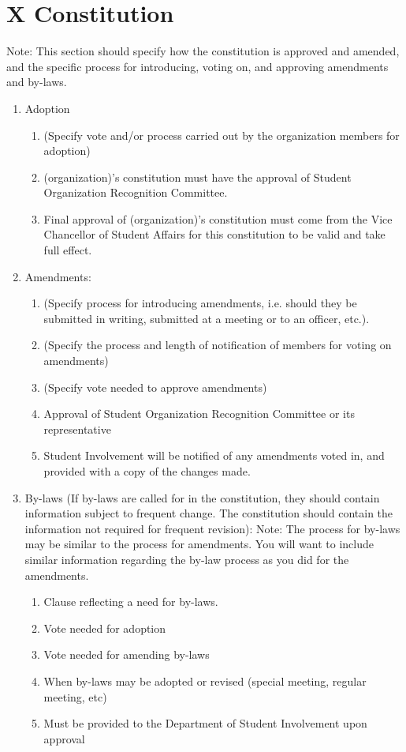 
\section{X \textendash{} Constitution}
Note:  This section should specify how the constitution is approved and amended,
and the specific process for introducing, voting on, and approving amendments
and by-laws.
\begin{enumerate}
  \item Adoption
    \begin{enumerate}
      \item	(Specify vote and/or process carried out by the organization members
      for adoption)
      \item	(organization)’s constitution must have the approval of Student
      Organization Recognition Committee.
      \item	Final approval of (organization)’s constitution must come from the
      Vice Chancellor of Student Affairs for this constitution to be valid and
      take full effect.
    \end{enumerate}
  \item	Amendments:
    \begin{enumerate}
      \item	(Specify process for introducing amendments, i.e. should they be
      submitted in writing, submitted at a meeting or to an officer, etc.).
      \item	(Specify the process and length of notification of members for
      voting on amendments)
      \item	(Specify vote needed to approve amendments)
      \item	Approval of Student Organization Recognition Committee or its
      representative
      \item	Student Involvement will be notified of any amendments voted in, and
      provided with a copy of the changes made.
    \end{enumerate}
  \item	By-laws (If by-laws are called for in the constitution, they should
contain information subject to frequent change.  The constitution should contain
the information not required for frequent revision): Note:  The process for
by-laws may be similar to the process for amendments.  You will want to include
similar information regarding the by-law process as you did for the amendments.
    \begin{enumerate}
      \item	Clause reflecting a need for by-laws.
      \item	Vote needed for adoption
      \item	Vote needed for amending by-laws
      \item	When by-laws may be adopted or revised (special meeting, regular
      meeting, etc)
      \item	Must be provided to the Department of Student Involvement upon
      approval
    \end{enumerate}
\end{enumerate}

